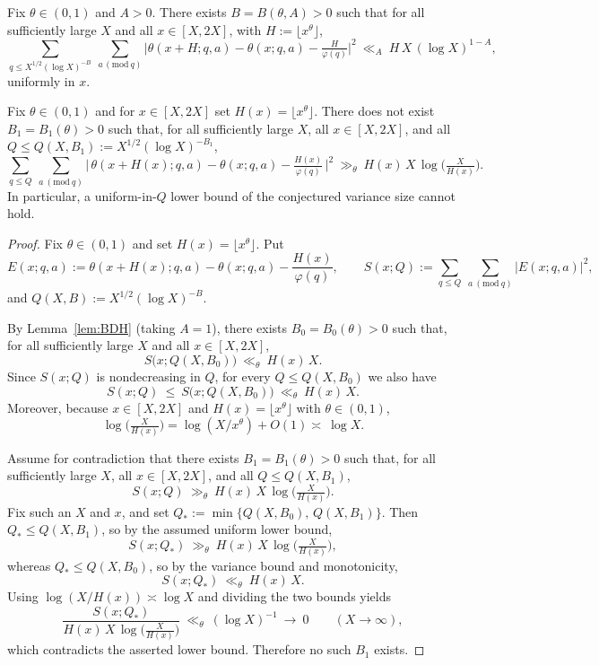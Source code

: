 \documentclass[10pt,a4paper]{amsart}
\begin{document}
\begin{lemma}\label{lem:BDH}
Fix $\theta\in(0,1)$ and $A>0$. There exists $B=B(\theta,A)>0$ such that for all sufficiently large $X$ and all $x\in[X,2X]$, with $H:=\lfloor x^\theta\rfloor$,
\[
\sum_{q\le X^{1/2}(\log X)^{-B}}\ \sum_{a\,(\mathrm{mod}\ q)}
\Big|\theta(x+H;q,a)-\theta(x;q,a)-\tfrac{H}{\varphi(q)}\Big|^2\ \ll_A\ H\,X\,(\log X)^{1-A},
\]
uniformly in $x$.
\end{lemma}

\begin{proposition}\label{prop:no-uniform-Q}
Fix $\theta\in(0,1)$ and for $x\in[X,2X]$ set $H(x)=\lfloor x^\theta\rfloor$. There does not exist $B_1=B_1(\theta)>0$ such that, for all sufficiently large $X$, all $x\in[X,2X]$, and all $Q\le Q(X,B_1):=X^{1/2}(\log X)^{-B_1}$,
\[
\sum_{q\le Q}\ \sum_{a\ (\mathrm{mod}\ q)} \Big|\,\theta(x+H(x);q,a)-\theta(x;q,a)-\tfrac{H(x)}{\varphi(q)}\,\Big|^2\ \gg_{\theta}\ H(x)\,X\,\log\!\Big(\tfrac{X}{H(x)}\Big).
\]
In particular, a uniform-in-$Q$ lower bound of the conjectured variance size cannot hold.
\end{proposition}

\begin{proof}
Fix $\theta\in(0,1)$ and set $H(x)=\lfloor x^\theta\rfloor$. Put
\[
E(x;q,a):=\theta(x+H(x);q,a)-\theta(x;q,a)-\frac{H(x)}{\varphi(q)},\qquad
S(x;Q):=\sum_{q\le Q}\ \sum_{a\ (\mathrm{mod}\ q)} |E(x;q,a)|^2,
\]
and $Q(X,B):=X^{1/2}(\log X)^{-B}$.

By Lemma~\ref{lem:BDH} (taking $A=1$), there exists $B_0=B_0(\theta)>0$ such that, for all sufficiently large $X$ and all $x\in[X,2X]$,
\[
S\big(x;Q(X,B_0)\big)\ \ll_{\theta}\ H(x)\,X.
\]
Since $S(x;Q)$ is nondecreasing in $Q$, for every $Q\le Q(X,B_0)$ we also have
\[
S(x;Q)\ \le\ S\big(x;Q(X,B_0)\big)\ \ll_{\theta}\ H(x)\,X.
\]
Moreover, because $x\in[X,2X]$ and $H(x)=\lfloor x^\theta\rfloor$ with $\theta\in(0,1)$,
\[
\log\!\Big(\tfrac{X}{H(x)}\Big)=\log(X/x^\theta)+O(1)\asymp\ \log X.
\]

Assume for contradiction that there exists $B_1=B_1(\theta)>0$ such that, for all sufficiently large $X$, all $x\in[X,2X]$, and all $Q\le Q(X,B_1)$,
\[
S(x;Q)\ \gg_{\theta}\ H(x)\,X\,\log\!\Big(\tfrac{X}{H(x)}\Big).
\]
Fix such an $X$ and $x$, and set $Q_*:=\min\{Q(X,B_0),\,Q(X,B_1)\}$. Then $Q_*\le Q(X,B_1)$, so by the assumed uniform lower bound,
\[
S(x;Q_*)\ \gg_{\theta}\ H(x)\,X\,\log\!\Big(\tfrac{X}{H(x)}\Big),
\]
whereas $Q_*\le Q(X,B_0)$, so by the variance bound and monotonicity,
\[
S(x;Q_*)\ \ll_{\theta}\ H(x)\,X.
\]
Using $\log(X/H(x))\asymp\log X$ and dividing the two bounds yields
\[
\frac{S(x;Q_*)}{H(x)\,X\,\log\!\big(\tfrac{X}{H(x)}\big)}\ \ll_{\theta}\ (\log X)^{-1}\ \to\ 0\qquad (X\to\infty),
\]
which contradicts the asserted lower bound. Therefore no such $B_1$ exists.
\end{proof}
\end{document}
